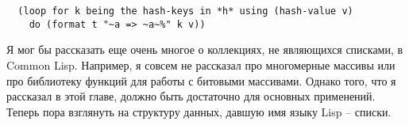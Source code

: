 \begin{lstlisting}  
  (loop for k being the hash-keys in *h* using (hash-value v)
    do (format t "~a => ~a~%" k v))
\end{lstlisting}

Я мог бы рассказать еще очень многое о коллекциях, не являющихся списками, в Common
Lisp.  Например, я совсем не рассказал про многомерные массивы или про библиотеку функций
для работы с битовыми массивами.  Однако того, что я рассказал в этой главе, должно быть
достаточно для основных применений.  Теперь пора взглянуть на
структуру данных, давшую имя языку Lisp -- списки.


